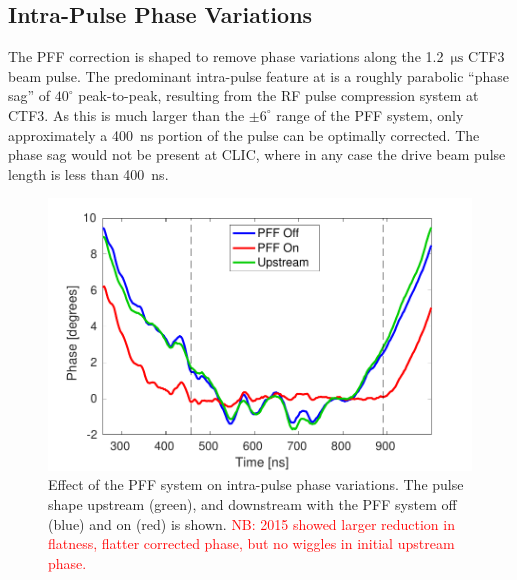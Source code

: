 \documentclass[%
 reprint,
 amsmath,amssymb,
 prl,
]{revtex4-1}
\begin{document}
\subsection{\label{ss:shape}Intra-Pulse Phase Variations}

The PFF correction is shaped to remove phase variations along the 
1.2~\(\mathrm{\mu s}\) CTF3 beam pulse. The predominant intra-pulse feature at 
is a roughly parabolic ``phase sag'' of \(40^\circ\) peak-to-peak, resulting 
from the RF pulse compression system at CTF3. As this is much larger than the 
\(\pm 6^\circ\) range of the PFF system, only approximately a 400~ns portion of 
the pulse can be optimally corrected. The phase sag would not be present at 
CLIC, where in any case the drive beam pulse length is less than 400~ns.



\begin{figure}
	\includegraphics[width=\columnwidth]{figs/shape}%
	\caption{\label{fig:shape}Effect of the PFF system on intra-pulse phase 
		variations. The pulse shape upstream (green), and downstream with the 
		PFF 
		system off (blue) and on (red) is shown. \textcolor{red}{NB: 
			2015 showed larger reduction in flatness, flatter corrected phase, 
			but no 
			wiggles in initial upstream phase.}}
\end{figure}
\end{document}
